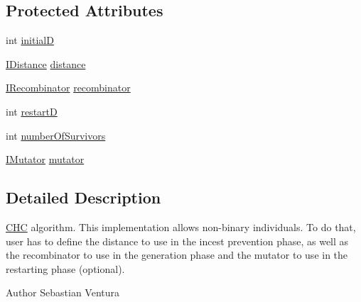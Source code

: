 \subsection*{Protected Attributes}
\begin{DoxyCompactItemize}
\item 
int \hyperlink{classnet_1_1sf_1_1jclec_1_1algorithm_1_1classic_1_1_c_h_c_a4b7c785a6c035901c27655736802f1d5}{initial\-D}
\item 
\hyperlink{interfacenet_1_1sf_1_1jclec_1_1_i_distance}{I\-Distance} \hyperlink{classnet_1_1sf_1_1jclec_1_1algorithm_1_1classic_1_1_c_h_c_af5aede7c9435b3e8d6826e880c7247dc}{distance}
\item 
\hyperlink{interfacenet_1_1sf_1_1jclec_1_1_i_recombinator}{I\-Recombinator} \hyperlink{classnet_1_1sf_1_1jclec_1_1algorithm_1_1classic_1_1_c_h_c_ab57efc757b80ad7047b60477e7329718}{recombinator}
\item 
int \hyperlink{classnet_1_1sf_1_1jclec_1_1algorithm_1_1classic_1_1_c_h_c_a6cd78db6a675d92c105ee5e4cf5abe68}{restart\-D}
\item 
int \hyperlink{classnet_1_1sf_1_1jclec_1_1algorithm_1_1classic_1_1_c_h_c_a1b2005c9606fa0bd250efda96aa078d9}{number\-Of\-Survivors}
\item 
\hyperlink{interfacenet_1_1sf_1_1jclec_1_1_i_mutator}{I\-Mutator} \hyperlink{classnet_1_1sf_1_1jclec_1_1algorithm_1_1classic_1_1_c_h_c_adfd26c19f5be720ec4dc4199b99cdf96}{mutator}
\end{DoxyCompactItemize}


\subsection{Detailed Description}
\hyperlink{classnet_1_1sf_1_1jclec_1_1algorithm_1_1classic_1_1_c_h_c}{C\-H\-C} algorithm. This implementation allows non-\/binary individuals. To do that, user has to define the distance to use in the incest prevention phase, as well as the recombinator to use in the generation phase and the mutator to use in the restarting phase (optional).

\begin{DoxyAuthor}{Author}
Sebastian Ventura 
\end{DoxyAuthor}


